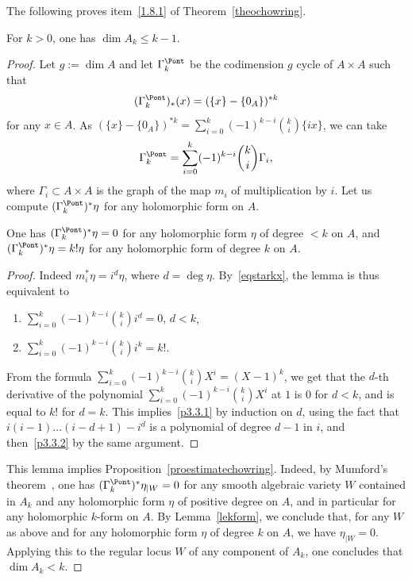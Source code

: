 The following proves item~\eqref{1.8.1} of Theorem~\ref{theochowring}.

\begin{prop}\label{proestimatechowring}
For $k>0$, one has $\dim  A_k\leq k-1$.
\end{prop}

\begin{proof}
Let $g:=\dim A$ and let $\Gamma^{\Pont}_k$ be the codimension $g$ cycle of
$A\times A$ such that
\[
(\Gamma^{\Pont}_{k })_*(x)=(\{x\}-\{0_A\})^{*k}
\]
for any $x\in A$. As $(\{x\}-\{0_A\})^{*k}=\sum_{i=0}^k(-1)^{k-i}\binom{k}{i}\{ix\}$, we can take
\begin{equation}\label{eqstarkx}
\Gamma^{\Pont}_k=\sum_{i=0}^k(-1)^{k-i}\binom{k}{i}\Gamma_{i},
\end{equation}
where $\Gamma_i\subset A\times A$ is the graph of the map $m_i$ of multiplication by $i$. Let us compute $(\Gamma_k^{\Pont})^*\eta$ for any holomorphic form on $A$.

\begin{lemm}\label{lekform}
One has $(\Gamma^{\Pont}_k)^*\eta=0$ for any holomorphic form $\eta$ of degree $<k$ on $A$, and $(\Gamma_k^{\Pont})^*\eta=k!\eta$ for any holomorphic form of degree $k$ on $A$.
\end{lemm}

\begin{proof}
Indeed $m_i^*\eta=i^d\eta$, where $d=\deg \eta$.
By~\eqref{eqstarkx}, the lemma is thus equivalent to
\begin{enumerate}
\item \label{p3.3.1} $\sum_{i=0}^k(-1)^{k-i}\binom{k}{i} i^d=0,\,d<k$,
\item \label{p3.3.2} $\sum_{i=0}^k(-1)^{k-i}\binom{k}{i} i^k=k!$.
\end{enumerate}

From the formula $\sum_{i=0}^k(-1)^{k-i}\binom{k}{i}X^i=(X-1)^k$, we get that the $d$-th derivative of the polynomial $\sum_{i=0}^k(-1)^{k-i}\binom{k}{i}X^i$ at $1$ is $0$ for $d<k$, and is equal to $k!$ for $d=k$. This implies~\eqref{p3.3.1} by induction on $d$, using the fact that $i(i-1)\dots(i-d+1)-i^d$ is a polynomial of degree $d-1$ in $i$, and then~\eqref{p3.3.2} by the same argument.
\end{proof}

This lemma implies Proposition~\ref{proestimatechowring}. Indeed, by Mumford's theorem~\cite{mumford}, one has $(\Gamma^{\Pont}_k)^*\eta_{\mid W}=0$ for any smooth algebraic variety $W$ contained in $A_k$ and any holomorphic form $\eta$ of positive degree on $A$, and in particular for any holomorphic $k$-form on $A$. By Lemma~\ref{lekform}, we conclude that, for any $W$ as above and for any holomorphic form $\eta$ of degree $k$ on $A$, we have $\eta_{\mid W}=0$. Applying this to the regular locus $W$ of any component of $A_k$, one concludes that $\dim A_k<k$.
\end{proof}

